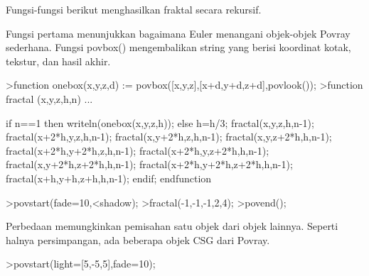 \documentclass[a4paper,10pt]{article}
\begin{document}
\begin{eulernotebook}
\begin{eulercomment}
\begin{eulercomment}
\begin{eulercomment}
\begin{eulercomment}
\begin{eulercomment}
\begin{eulercomment}
\begin{eulercomment}
\begin{eulercomment}
\begin{eulercomment}
\begin{eulercomment}
\begin{eulercomment}
\begin{eulercomment}
\begin{eulercomment}
\begin{eulercomment}
\begin{eulercomment}
\begin{eulercomment}
\begin{eulercomment}
\begin{eulercomment}
\begin{eulercomment}
\begin{eulercomment}
\begin{eulercomment}
\begin{eulercomment}
\begin{eulercomment}
\begin{eulercomment}
\begin{eulercomment}
\begin{eulercomment}
\begin{eulercomment}
\begin{eulercomment}
\begin{eulercomment}
\begin{eulercomment}
\begin{eulercomment}
\begin{eulercomment}
\begin{eulercomment}
\begin{eulercomment}
\begin{eulercomment}
\begin{eulercomment}
\begin{eulercomment}
\begin{eulercomment}
\begin{eulercomment}
\begin{eulercomment}
\begin{eulercomment}
Fungsi-fungsi berikut menghasilkan fraktal secara rekursif.

Fungsi pertama menunjukkan bagaimana Euler menangani objek-objek
Povray sederhana. Fungsi povbox() mengembalikan string yang berisi
koordinat kotak, tekstur, dan hasil akhir.
\end{eulercomment}
\begin{eulerprompt}
>function onebox(x,y,z,d) := povbox([x,y,z],[x+d,y+d,z+d],povlook());
>function fractal (x,y,z,h,n) ...
\end{eulerprompt}
\begin{eulerudf}
   if n==1 then writeln(onebox(x,y,z,h));
   else
     h=h/3;
     fractal(x,y,z,h,n-1);
     fractal(x+2*h,y,z,h,n-1);
     fractal(x,y+2*h,z,h,n-1);
     fractal(x,y,z+2*h,h,n-1);
     fractal(x+2*h,y+2*h,z,h,n-1);
     fractal(x+2*h,y,z+2*h,h,n-1);
     fractal(x,y+2*h,z+2*h,h,n-1);
     fractal(x+2*h,y+2*h,z+2*h,h,n-1);
     fractal(x+h,y+h,z+h,h,n-1);
   endif;
  endfunction
\end{eulerudf}
\begin{eulerprompt}
>povstart(fade=10,<shadow);
>fractal(-1,-1,-1,2,4);
>povend();
\end{eulerprompt}
\begin{eulercomment}
Perbedaan memungkinkan pemisahan satu objek dari objek lainnya.
Seperti halnya persimpangan, ada beberapa objek CSG dari Povray.
\end{eulercomment}
\begin{eulerprompt}
>povstart(light=[5,-5,5],fade=10);

\end{eulerprompt}
\end{eulercomment}
\end{eulercomment}
\end{eulercomment}
\end{eulercomment}
\end{eulercomment}
\end{eulercomment}
\end{eulercomment}
\end{eulercomment}
\end{eulercomment}
\end{eulercomment}
\end{eulercomment}
\end{eulercomment}
\end{eulercomment}
\end{eulercomment}
\end{eulercomment}
\end{eulercomment}
\end{eulercomment}
\end{eulercomment}
\end{eulercomment}
\end{eulercomment}
\end{eulercomment}
\end{eulercomment}
\end{eulercomment}
\end{eulercomment}
\end{eulercomment}
\end{eulercomment}
\end{eulercomment}
\end{eulercomment}
\end{eulercomment}
\end{eulercomment}
\end{eulercomment}
\end{eulercomment}
\end{eulercomment}
\end{eulercomment}
\end{eulercomment}
\end{eulercomment}
\end{eulercomment}
\end{eulercomment}
\end{eulercomment}
\end{eulercomment}
\end{eulernotebook}
\end{document}
